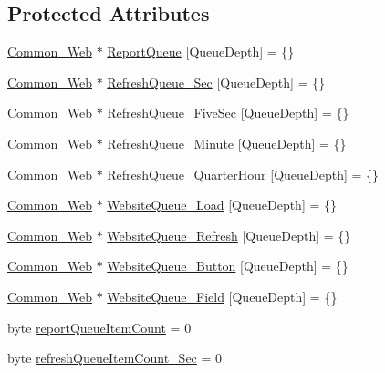 \subsection*{Protected Attributes}
\begin{DoxyCompactItemize}
\item 
\hyperlink{class_common___web}{Common\+\_\+\+Web} $\ast$ \hyperlink{class_module___web_abe0a83972d143ed3023654c0fa55b675}{Report\+Queue} \mbox{[}Queue\+Depth\mbox{]} = \{\}
\item 
\hyperlink{class_common___web}{Common\+\_\+\+Web} $\ast$ \hyperlink{class_module___web_ab418ff1e6c36e3d62878eb2567b3e3ce}{Refresh\+Queue\+\_\+\+Sec} \mbox{[}Queue\+Depth\mbox{]} = \{\}
\item 
\hyperlink{class_common___web}{Common\+\_\+\+Web} $\ast$ \hyperlink{class_module___web_af28272924b12501772a2dfc2d7c0c0d9}{Refresh\+Queue\+\_\+\+Five\+Sec} \mbox{[}Queue\+Depth\mbox{]} = \{\}
\item 
\hyperlink{class_common___web}{Common\+\_\+\+Web} $\ast$ \hyperlink{class_module___web_ac002b8dc45aa65394953d28a0f8020ee}{Refresh\+Queue\+\_\+\+Minute} \mbox{[}Queue\+Depth\mbox{]} = \{\}
\item 
\hyperlink{class_common___web}{Common\+\_\+\+Web} $\ast$ \hyperlink{class_module___web_ae93c875964516f3c050e1de917b3045f}{Refresh\+Queue\+\_\+\+Quarter\+Hour} \mbox{[}Queue\+Depth\mbox{]} = \{\}
\item 
\hyperlink{class_common___web}{Common\+\_\+\+Web} $\ast$ \hyperlink{class_module___web_aeeeb87ceef2859b67932435fbac1346d}{Website\+Queue\+\_\+\+Load} \mbox{[}Queue\+Depth\mbox{]} = \{\}
\item 
\hyperlink{class_common___web}{Common\+\_\+\+Web} $\ast$ \hyperlink{class_module___web_a6c9b49ae5239ae9f17cd12f81b025878}{Website\+Queue\+\_\+\+Refresh} \mbox{[}Queue\+Depth\mbox{]} = \{\}
\item 
\hyperlink{class_common___web}{Common\+\_\+\+Web} $\ast$ \hyperlink{class_module___web_a5c2bce6018f0dcc3984c9e033cbd7c3b}{Website\+Queue\+\_\+\+Button} \mbox{[}Queue\+Depth\mbox{]} = \{\}
\item 
\hyperlink{class_common___web}{Common\+\_\+\+Web} $\ast$ \hyperlink{class_module___web_a784fa6532d67096b859360087abdeeca}{Website\+Queue\+\_\+\+Field} \mbox{[}Queue\+Depth\mbox{]} = \{\}
\item 
byte \hyperlink{class_module___web_a4d9adb9cf471680253e2e53e71a7289d}{report\+Queue\+Item\+Count} = 0
\item 
byte \hyperlink{class_module___web_a539babe0fd9ab225003d4b883eb22ad0}{refresh\+Queue\+Item\+Count\+\_\+\+Sec} = 0

\end{DoxyCompactItemize}
